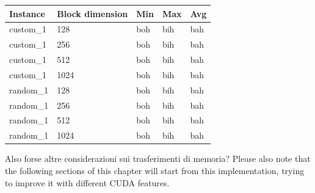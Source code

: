 \documentclass[12pt]{extarticle}
\begin{document}
\begin{center}
\begin{tabular}{ | m{2.2cm} | m{3.2cm} | m{2.2cm} | m{2.2cm} | m{2.2cm} |}
 \hline
 Instance & Block dimension & Min & Max & Avg\\
 \hline
 custom\_1 & 128 & boh & bih & bah\\
 \hline
 custom\_1 & 256 & boh & bih & bah\\
 \hline
 custom\_1 & 512 & boh & bih & bah\\
 \hline
 custom\_1 & 1024 & boh & bih & bah\\
 \hline
 random\_1 & 128 & boh & bih & bah\\
 \hline
 random\_1 & 256 & boh & bih & bah\\
 \hline
 random\_1 & 512 & boh & bih & bah\\
 \hline
 random\_1 & 1024 & boh & bih & bah\\
 \hline
 \end{tabular}
 \end{center}
Also forse altre considerazioni sui trasferimenti di memoria?\newline
Please also note that the following sections of this chapter will start from this implementation, trying to improve it with different CUDA features.
\end{document}

